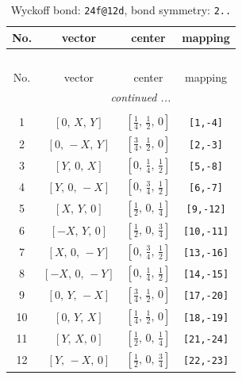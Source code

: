 \documentclass[fleqn,8pt]{jsarticle}
\begin{document}
\renewcommand{\arraystretch}{1.2}
\begin{longtable}{cccc}
\caption{Wyckoff bond: {\tt 24f@12d}, bond symmetry: {\tt 2..}}
 \\
 \hline \hline
No. & vector & center & mapping \\ \hline \endfirsthead

\multicolumn{3}{l}{\tablename\ \thetable{}} \\
 \hline \hline
No. & vector & center & mapping \\ \hline \endhead

 \hline \hline
\multicolumn{3}{r}{\footnotesize\it continued ...} \\ \endfoot

 \hline \hline
\multicolumn{3}{r}{} \\ \endlastfoot

1 & $\left[ 0,\, X,\, Y \right]$ & $\left[ \frac{1}{4},\, \frac{1}{2},\, 0 \right]$ & {\tt [1,-4]} \\ \hline
2 & $\left[ 0,\, - X,\, Y \right]$ & $\left[ \frac{3}{4},\, \frac{1}{2},\, 0 \right]$ & {\tt [2,-3]} \\ \hline
3 & $\left[ Y,\, 0,\, X \right]$ & $\left[ 0,\, \frac{1}{4},\, \frac{1}{2} \right]$ & {\tt [5,-8]} \\ \hline
4 & $\left[ Y,\, 0,\, - X \right]$ & $\left[ 0,\, \frac{3}{4},\, \frac{1}{2} \right]$ & {\tt [6,-7]} \\ \hline
5 & $\left[ X,\, Y,\, 0 \right]$ & $\left[ \frac{1}{2},\, 0,\, \frac{1}{4} \right]$ & {\tt [9,-12]} \\ \hline
6 & $\left[ - X,\, Y,\, 0 \right]$ & $\left[ \frac{1}{2},\, 0,\, \frac{3}{4} \right]$ & {\tt [10,-11]} \\ \hline
7 & $\left[ X,\, 0,\, - Y \right]$ & $\left[ 0,\, \frac{3}{4},\, \frac{1}{2} \right]$ & {\tt [13,-16]} \\ \hline
8 & $\left[ - X,\, 0,\, - Y \right]$ & $\left[ 0,\, \frac{1}{4},\, \frac{1}{2} \right]$ & {\tt [14,-15]} \\ \hline
9 & $\left[ 0,\, Y,\, - X \right]$ & $\left[ \frac{3}{4},\, \frac{1}{2},\, 0 \right]$ & {\tt [17,-20]} \\ \hline
10 & $\left[ 0,\, Y,\, X \right]$ & $\left[ \frac{1}{4},\, \frac{1}{2},\, 0 \right]$ & {\tt [18,-19]} \\ \hline
11 & $\left[ Y,\, X,\, 0 \right]$ & $\left[ \frac{1}{2},\, 0,\, \frac{1}{4} \right]$ & {\tt [21,-24]} \\ \hline
12 & $\left[ Y,\, - X,\, 0 \right]$ & $\left[ \frac{1}{2},\, 0,\, \frac{3}{4} \right]$ & {\tt [22,-23]} \\
\end{longtable}
\end{document}
